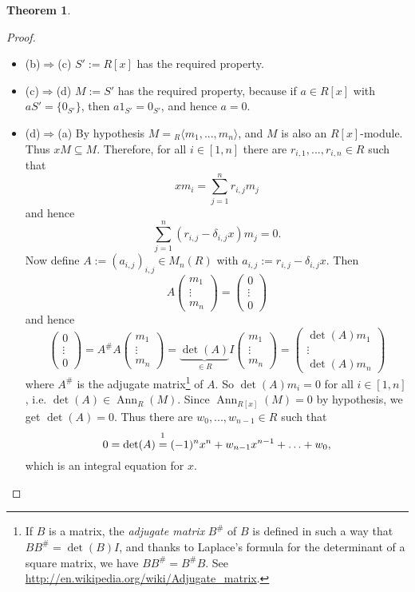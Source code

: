\documentclass[12pt,a4paper]{report}
\theoremstyle{definition}
\newtheorem{theorem}{Theorem}[chapter] %
\theoremstyle{num.custom-title}
\newenvironment{claim}[1]{\par\noindent\underline{Claim#1:}\space}{} %
\newenvironment{claimproof}[1]{\par\noindent\underline{Proof:}\space#1}{\leavevmode\unskip\penalty9999 \hbox{}\nobreak\hfill\quad\hbox{$\blacksquare$}} %
\DeclareMathOperator{\Ann}{Ann}
\DeclareMathOperator{\imp}{\Rightarrow}
\DeclareMathOperator{\sse}{\subseteq}
\begin{document}
\begin{theorem}
\begin{proof}
\begin{itemize}
\begin{claim}{}
\begin{claimproof}
\begin{multline*}
\end{multline*}
\end{claimproof}
\item[(b)$\imp$(c)] $S':=R[x]$ has the required property.
\item[(c)$\imp$(d)] $M:=S'$ has the required property, because if $a \in R[x]$ with $aS'=\{0_{S'}\}$, then $a 1_{S'} = 0_{S'}$, and hence $a=0$.
\item[(d)$\imp$(a)] By hypothesis $M = {}_R \langle m_1,...,m_n \rangle$, and $M$ is also an $R[x]$-module. Thus $x M \sse M$. Therefore, for all $i \in [1,n]$ there are $r_{i,1},...,r_{i,n} \in R$ such that
\[
x m_i = \sum_{j=1}^n r_{i,j} m_j
\]
and hence
\[
\sum_{j=1}^n (r_{i,j} - \delta_{i,j} x) m_j = 0.
\]
Now define $A:=(a_{i,j})_{i,j} \in M_n(R)$ with $a_{i,j} := r_{i,j} - \delta_{i,j} x$. Then
\[
A
\begin{pmatrix}
m_1 \\ \vdots \\ m_n
\end{pmatrix}
=
\begin{pmatrix}
0 \\ \vdots \\ 0
\end{pmatrix}
\]
and hence
\[
\begin{pmatrix}
0 \\ \vdots \\ 0
\end{pmatrix}
=
A^\# A
\begin{pmatrix}
m_1 \\ \vdots \\ m_n
\end{pmatrix}
= \underbrace{\det(A)}_{\in R} I
\begin{pmatrix}
m_1 \\ \vdots \\ m_n
\end{pmatrix}
=
\begin{pmatrix}
\det(A) m_1 \\ \vdots \\ \det(A) m_n
\end{pmatrix}
\]
where $A^\#$ is the adjugate matrix\footnote{If $B$ is a matrix, the \emph{adjugate matrix} $B^\#$ of $B$ is defined in such a way that $B B^\# = \det(B) I$, and thanks to Laplace's formula for the determinant of a square matrix, we have $B B^\# = B^\# B$. See \url{http://en.wikipedia.org/wiki/Adjugate_matrix}.} of $A$. So $\det(A) m_i = 0$ for all $i \in [1,n]$, i.e. $\det(A) \in \Ann_R(M)$. Since $\Ann_{R[x]}(M)=0$ by hypothesis, we get $\det(A)=0$. Thus there are $w_0,...,w_{n-1} \in R$ such that
\[
0 = \det(A) \stackrel{\footnotemark}{=} (-1)^n x^n + w_{n-1} x^{n-1} + \ldots + w_0,
\]
which is an integral equation for $x$.
\end{claim}
\end{itemize}
\end{proof}
\end{theorem}
\end{document}
